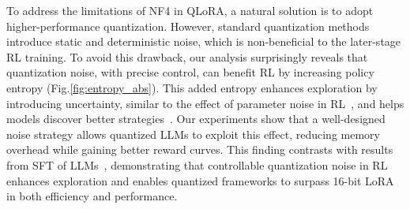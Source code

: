 

To address the limitations of NF4 in QLoRA, a natural solution is to adopt higher-performance quantization.
However, standard quantization methods introduce static and deterministic noise, which is non-beneficial to the later-stage RL training.
To avoid this drawback, our analysis surprisingly reveals that quantization noise, with precise control, can benefit RL by increasing policy entropy (Fig.\ref{fig:entropy_abs}). This added entropy enhances exploration by introducing uncertainty, similar to the effect of parameter noise in RL~\citep{plappert2017parameter,pang2021robust}, and helps models discover better strategies~\citep{cui2025entropy}. 
Our experiments show that a well-designed noise strategy allows quantized LLMs to exploit this effect, reducing memory overhead while gaining better reward curves. This finding contrasts with results from SFT of LLMs~\citep{qlora, guo2023lq}, demonstrating that controllable quantization noise in RL enhances exploration and enables quantized frameworks to surpass 16-bit LoRA in both efficiency and performance.

